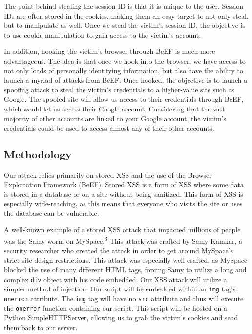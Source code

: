 \documentclass{article}
\begin{document}
    The point behind stealing the session ID is that it is unique to the user. Session IDs are often stored in the cookies, making them an easy target to not only steal, but to manipulate as well. Once we steal the victim's session ID, the objective is to use cookie manipulation to gain access to the victim's account.

    \vspace{8pt}

    In addition, hooking the victim's browser through BeEF is much more advantageous. The idea is that once we hook into the browser, we have access to not only loads of personally identifying information, but also have the ability to launch a myriad of attacks from BeEF. Once hooked, the objective is to launch a spoofing attack to steal the victim's credentials to a higher-value site such as Google. The spoofed site will allow us access to their credentials through BeEF, which would let us access their Google account. Considering that the vast majority of other accounts are linked to your Google account, the victim's credentials could be used to access almost any of their other accounts.

    \subsection*{Methodology}

    Our attack relies primarily on stored XSS and the use of the Browser Exploitation Framework (BeEF). Stored XSS is a form of XSS where some data is stored in a database or on a site without being sanitized. This form of XSS is especially wide-reaching, as this means that everyone who visits the site or uses the database can be vulnerable.

    \vspace{8pt}

    A well-known example of a stored XSS attack that impacted millions of people was the Samy worm on MySpace.\textsuperscript{3} This attack was crafted by Samy Kamkar, a security researcher who created the attack in order to get around MySpace's strict site design restrictions. This attack was especially well crafted, as MySpace blocked the use of many different HTML tags, forcing Samy to utilize a long and complex \texttt{div} object with his code embedded. Our XSS attack will utilize a simpler method of injection. Our script will be embedded within an \texttt{img} tag's \texttt{onerror} attribute. The \texttt{img} tag will have no \texttt{src} attribute and thus will execute the \texttt{onerror} function containing our script. This script will be hosted on a Python SimpleHTTPServer, allowing us to grab the victim's cookies and send them back to our server.
\end{document}
